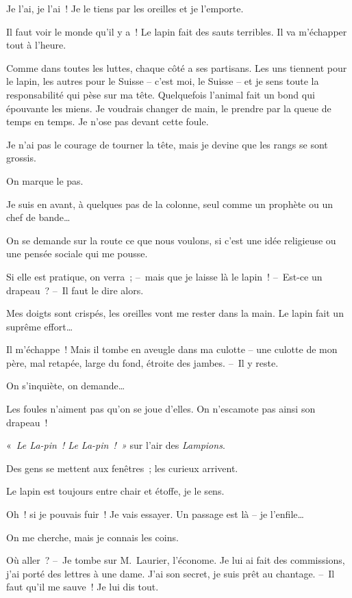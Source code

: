\documentclass[french,twoside]{book} %
\begin{document}
Je l’ai, je l’ai ! Je le tiens par les oreilles et je l’emporte.\par
Il faut voir le monde qu’il y a ! Le lapin fait des sauts terribles. Il va m’échapper tout à l’heure.\par
Comme dans toutes les luttes, chaque côté a ses partisans. Les uns tiennent pour le lapin, les autres pour le Suisse – c’est moi, le Suisse – et je sens toute la responsabilité qui pèse sur ma tête. Quelquefois l’animal fait un bond qui épouvante les miens. Je voudrais changer de main, le prendre par la queue de temps en temps. Je n’ose pas devant cette foule.\par
Je n’ai pas le courage de tourner la tête, mais je devine que les rangs se sont grossis.\par
On marque le pas.\par
Je suis en avant, à quelques pas de la colonne, seul comme un prophète ou un chef de bande…\par
On se demande sur la route ce que nous voulons, si c’est une idée religieuse ou une pensée sociale qui me pousse.\par
Si elle est pratique, on verra ; – mais que je laisse là le lapin ! – Est-ce un drapeau ? – Il faut le dire alors.\par
Mes doigts sont crispés, les oreilles vont me rester dans la main. Le lapin fait un suprême effort…\par
Il m’échappe ! Mais il tombe en aveugle dans ma culotte – une culotte de mon père, mal retapée, large du fond, étroite des jambes. – Il y reste.\par
On s’inquiète, on demande…\par
Les foules n’aiment pas qu’on se joue d’elles. On n’escamote pas ainsi son drapeau !\par
« \emph{Le La-pin ! Le La-pin ! »} sur l’air des \emph{Lampions}.\par
Des gens se mettent aux fenêtres ; les curieux arrivent.\par
Le lapin est toujours entre chair et étoffe, je le sens.\par
Oh ! si je pouvais fuir ! Je vais essayer. Un passage est là – je l’enfile…\par
On me cherche, mais je connais les coins.\par
Où aller ? – Je tombe sur M. Laurier, l’économe. Je lui ai fait des commissions, j’ai porté des lettres à une dame. J’ai son secret, je suis prêt au chantage. – Il faut qu’il me sauve ! Je lui dis tout.\par
\end{document}

